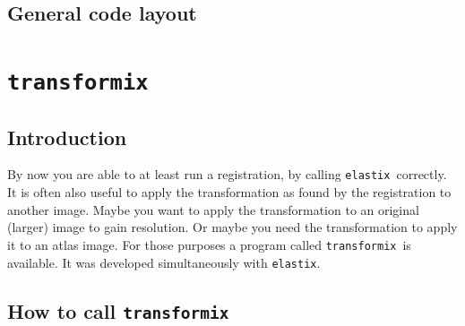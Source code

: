\documentclass[]{report}
\newcommand{\elastix}{\texttt{elastix}}
\newcommand{\transformix}{\texttt{transformix}}
\begin{document}
\section{General code layout}



\chapter{\transformix}\label{chp:transformix}

\section{Introduction}

By now you are able to at least run a registration, by calling
\elastix\ correctly. It is often also useful to apply the
transformation as found by the registration to another image. Maybe
you want to apply the transformation to an original (larger) image to
gain resolution. Or maybe you need the transformation to apply it to
an atlas image. For those purposes a program called \transformix\ is
available. It was developed simultaneously with \elastix.

\section{How to call \transformix}
\end{document}
